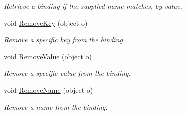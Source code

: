 \begin{DoxyCompactItemize}
\begin{DoxyCompactList}\small\item\em Retrieve a binding if the supplied name matches, by value. \end{DoxyCompactList}\item 
\hypertarget{interfacestrange_1_1framework_1_1api_1_1_i_binding_a45170158a551821a12300ec498107b93}{void \hyperlink{interfacestrange_1_1framework_1_1api_1_1_i_binding_a45170158a551821a12300ec498107b93}{Remove\-Key} (object o)}\label{interfacestrange_1_1framework_1_1api_1_1_i_binding_a45170158a551821a12300ec498107b93}

\begin{DoxyCompactList}\small\item\em Remove a specific key from the binding. \end{DoxyCompactList}\item 
\hypertarget{interfacestrange_1_1framework_1_1api_1_1_i_binding_ae74c9abff54a85859979aae0a0b5770a}{void \hyperlink{interfacestrange_1_1framework_1_1api_1_1_i_binding_ae74c9abff54a85859979aae0a0b5770a}{Remove\-Value} (object o)}\label{interfacestrange_1_1framework_1_1api_1_1_i_binding_ae74c9abff54a85859979aae0a0b5770a}

\begin{DoxyCompactList}\small\item\em Remove a specific value from the binding. \end{DoxyCompactList}\item 
\hypertarget{interfacestrange_1_1framework_1_1api_1_1_i_binding_addc5600176d59f33a7a5553db5ed33b7}{void \hyperlink{interfacestrange_1_1framework_1_1api_1_1_i_binding_addc5600176d59f33a7a5553db5ed33b7}{Remove\-Name} (object o)}\label{interfacestrange_1_1framework_1_1api_1_1_i_binding_addc5600176d59f33a7a5553db5ed33b7}

\begin{DoxyCompactList}\small\item\em Remove a name from the binding. \end{DoxyCompactList}\end{DoxyCompactItemize}
